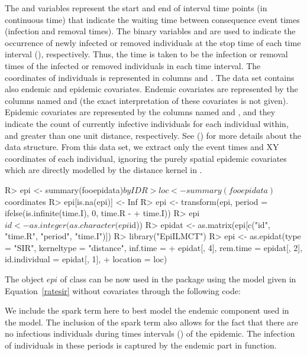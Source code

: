 \documentclass[nojss,shortnames]{jss}
\begin{document}
The  and  variables represent the start and end of interval time points (in continuous time) that indicate the waiting time between consequence event times (infection and removal times). The binary variables  and  are used to indicate the occurrence of newly infected or removed individuals at the stop time of each time interval (), respectively. 
Thus, the  time is taken to be the infection or removal times of the infected or removed individuals in each time interval. 
The coordinates of individuals is represented in columns  and . The 
 data set contains also endemic and epidemic covariates. Endemic covariates are represented by the columns named  and  (the exact interpretation of these covariates is not given). Epidemic covariates are represented by the columns named  and , and they indicate the count of currently infective individuals for each individual within, and greater than one unit distance, respectively. See () for more details about the data structure. From this data set,  we extract only the event times and XY coordinates of each individual, ignoring the purely spatial epidemic covariates which are directly modelled by the distance kernel in .
\begin{Sinput}
R> epi <- summary(fooepidata)$byID
R> loc <- summary(fooepidata)$coordinates
R> epi[is.na(epi)] <- Inf
R> epi <- transform(epi, period = ifelse(is.infinite(time.I), 0, time.R - 
+    time.I))
R> epi$id <- as.integer(as.character(epi$id))
R> epidat <- as.matrix(epi[c("id", "time.R", "period", "time.I")])
R> library("EpiILMCT")
R> epi <- as.epidat(type = "SIR", kerneltype = "distance", inf.time = 
+    epidat[, 4], rem.time = epidat[, 2], id.individual = epidat[, 1], 
+    location = loc)
\end{Sinput}

The object $epi$ of class  can be now used in the  package using the model given in Equation~\ref{ratesir} without covariates through the following code: 
We include the spark term here to best model the endemic component used in the  model. 
The inclusion of the spark term also allows for the fact that there are no infectious individuals during times intervals () of the epidemic.
The infection of individuals in these periods is captured by the endemic part in  function. 
\end{document}

